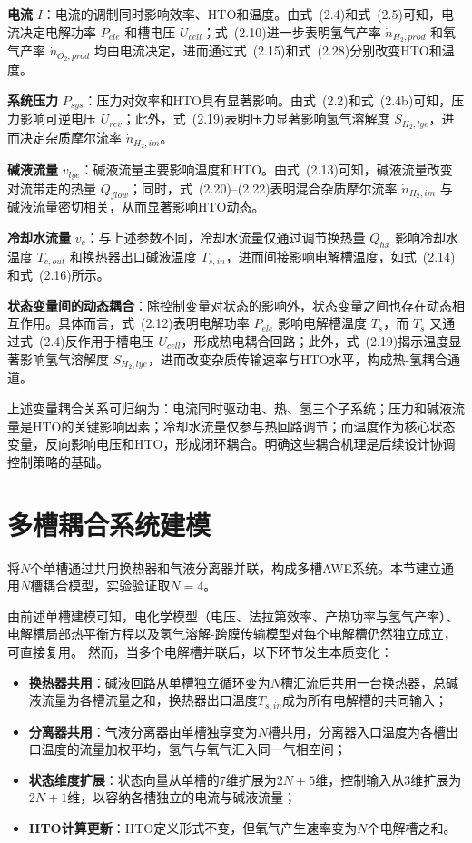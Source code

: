 \textbf{电流} $I$：电流的调制同时影响效率、HTO和温度。由式~(2.4)和式~(2.5)可知，电流决定电解功率 $P_{ele}$ 和槽电压 $U_{cell}$；式~(2.10)进一步表明氢气产率 $\dot{n}_{H_2,prod}$ 和氧气产率 $\dot{n}_{O_2,prod}$ 均由电流决定，进而通过式~(2.15)和式~(2.28)分别改变HTO和温度。

\textbf{系统压力} $P_{sys}$：压力对效率和HTO具有显著影响。由式~(2.2)和式~(2.4b)可知，压力影响可逆电压 $U_{rev}$；此外，式~(2.19)表明压力显著影响氢气溶解度 $S_{H_2,lye}$，进而决定杂质摩尔流率 $\dot{n}_{H_2,im}$。

\textbf{碱液流量} $v_{lye}$：碱液流量主要影响温度和HTO。由式~(2.13)可知，碱液流量改变对流带走的热量 $Q_{flow}$；同时，式~(2.20)--(2.22)表明混合杂质摩尔流率 $\dot{n}_{H_2,im}$ 与碱液流量密切相关，从而显著影响HTO动态。

\textbf{冷却水流量} $v_c$：与上述参数不同，冷却水流量仅通过调节换热量 $Q_{hx}$ 影响冷却水温度 $T_{c,out}$ 和换热器出口碱液温度 $T_{s,in}$，进而间接影响电解槽温度，如式~(2.14)和式~(2.16)所示。

\textbf{状态变量间的动态耦合}：除控制变量对状态的影响外，状态变量之间也存在动态相互作用。具体而言，式~(2.12)表明电解功率 $P_{ele}$ 影响电解槽温度 $T_s$，而 $T_s$ 又通过式~(2.4)反作用于槽电压 $U_{cell}$，形成热电耦合回路；此外，式~(2.19)揭示温度显著影响氢气溶解度 $S_{H_2,lye}$，进而改变杂质传输速率与HTO水平，构成热-氢耦合通道。

上述变量耦合关系可归纳为：电流同时驱动电、热、氢三个子系统；压力和碱液流量是HTO的关键影响因素；冷却水流量仅参与热回路调节；而温度作为核心状态变量，反向影响电压和HTO，形成闭环耦合。明确这些耦合机理是后续设计协调控制策略的基础。

\section{多槽耦合系统建模}

将$N$个单槽通过共用换热器和气液分离器并联，构成多槽AWE系统。本节建立通用$N$槽耦合模型，实验验证取$N=4$。

由前述单槽建模可知，电化学模型（电压、法拉第效率、产热功率与氢气产率）、电解槽局部热平衡方程以及氢气溶解-跨膜传输模型对每个电解槽仍然独立成立，可直接复用。
然而，当多个电解槽并联后，以下环节发生本质变化：
\begin{itemize}
  \item \textbf{换热器共用}：碱液回路从单槽独立循环变为$N$槽汇流后共用一台换热器，总碱液流量为各槽流量之和，换热器出口温度$T_{s,in}$成为所有电解槽的共同输入；
  \item \textbf{分离器共用}：气液分离器由单槽独享变为$N$槽共用，分离器入口温度为各槽出口温度的流量加权平均，氢气与氧气汇入同一气相空间；
  \item \textbf{状态维度扩展}：状态向量从单槽的7维扩展为$2N+5$维，控制输入从3维扩展为$2N+1$维，以容纳各槽独立的电流与碱液流量；
  \item \textbf{HTO计算更新}：HTO定义形式不变，但氧气产生速率变为$N$个电解槽之和。
\end{itemize}

